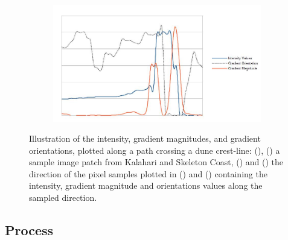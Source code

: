\begin{figure}[htbp]
\begin{subfigure}[b]{0.1\textwidth}
		\caption{}
		\label{fig:skeletoncoast_patch_arrow}
	\end{subfigure}
	\begin{subfigure}[b]{0.6\textwidth}
		\centering
		\includegraphics[width=\linewidth]{figures/skeletoncoast_patch_plot}
		\caption{}
		\label{fig:skeletoncoast_patch_plot}
	\end{subfigure}
	
	\caption{Illustration of the intensity, gradient magnitudes, and gradient orientations, plotted along a path crossing a dune crest-line: (), () a sample image patch from Kalahari and Skeleton Coast, () and () the direction of the pixel samples plotted in () and () containing the intensity, gradient magnitude and orientations values along the sampled direction. }
	\label{fig:patches}
\end{figure}

\subsection{Process}

